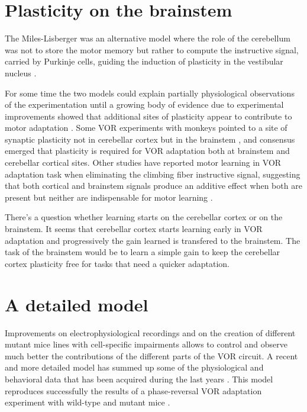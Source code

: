 \documentclass[12pt, a4paper,twoside]{tesi_upf}
\begin{document}
\begin{appendices}
\section{Plasticity on the brainstem}

The Miles-Lisberger was an alternative model where the role of the cerebellum was not to store the motor memory but rather to compute the instructive signal, carried by Purkinje cells, guiding the induction of plasticity in the vestibular nucleus \cite{Lac1995}.

For some time the two models could explain partially physiological observations of the experimentation until a growing body of evidence due to experimental improvements showed that additional sites of plasticity appear to contribute to motor adaptation \cite{Gao2012}. Some VOR experiments with monkeys pointed to a site of synaptic plasticity not in cerebellar cortex but in the brainstem \cite{Lisberger2009}, and consensus emerged that plasticity is required for VOR adaptation both at brainstem and cerebellar cortical sites. Other studies have reported motor learning in VOR adaptation task when eliminating the climbing fiber instructive signal, suggesting that both cortical and brainstem signals produce an additive effect when both are present but neither are indispensable for motor learning \cite{Ke2009a}.

There's a question whether learning starts on the cerebellar cortex or on the brainstem. It seems that cerebellar cortex starts learning early in VOR adaptation and progressively the gain learned is transfered to the brainstem. The task of the brainstem would be to learn a simple gain to keep the cerebellar cortex plasticity free for tasks that need a quicker adaptation.

\section{A detailed model}

Improvements on electrophysiological recordings and on the creation of different mutant mice lines with cell-specific impairments allows to control and observe much better the contributions of the different parts of the VOR circuit. A recent and more detailed model has summed up some of the physiological and behavioral data that has been acquired during the last years \cite{Clopath2014}. This model reproduces successfully the results of a phase-reversal VOR adaptation experiment with wild-type and mutant mice \cite{Wulff2009a}.


\end{appendices}
\end{document}
